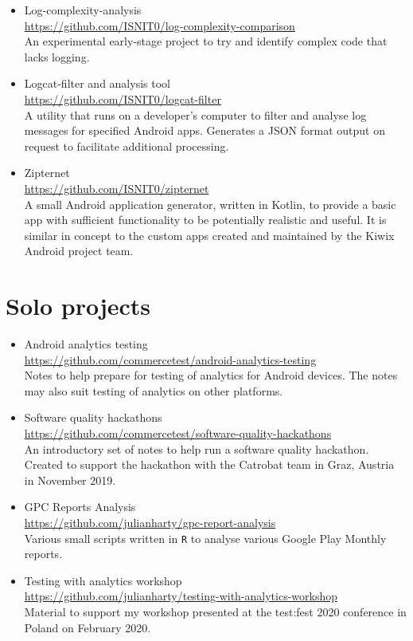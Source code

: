 \begin{itemize}
    \item Log-complexity-analysis\\ \url{https://github.com/ISNIT0/log-complexity-comparison}\\ An experimental early-stage project to try and identify complex code that lacks logging.
    \item Logcat-filter and analysis tool\\ \url{https://github.com/ISNIT0/logcat-filter}\\ A utility that runs on a developer's computer to filter and analyse log messages for specified Android apps. Generates a JSON format output on request to facilitate additional processing.
    
    
    \item Zipternet\\ \url{https://github.com/ISNIT0/zipternet}\\ A small Android application generator, written in Kotlin, to provide a basic app with sufficient functionality to be potentially realistic and useful. It is similar in concept to the custom apps created and maintained by the Kiwix Android project team.
\end{itemize}

\section{Solo projects}
\begin{itemize}
    \item Android analytics testing\\ \url{https://github.com/commercetest/android-analytics-testing}\\ Notes to help prepare for testing of analytics for Android devices. The notes may also suit testing of analytics on other platforms.

    \item Software quality hackathons\\ \url{https://github.com/commercetest/software-quality-hackathons}\\ An introductory set of notes to help run a software quality hackathon. Created to support the hackathon with the Catrobat team in Graz, Austria in November 2019. 
    \item GPC Reports Analysis\\ \url{https://github.com/julianharty/gpc-report-analysis}\\ Various small scripts written in \texttt{R} to analyse various Google Play Monthly reports.
    
    \item Testing with analytics workshop\\ \url{https://github.com/julianharty/testing-with-analytics-workshop}\\ Material to support my workshop presented at the test:fest 2020 conference in Poland on  February 2020.
\end{itemize}


